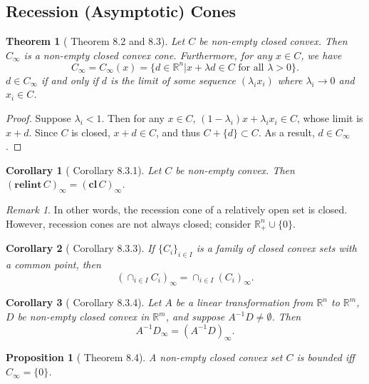 \documentclass[openany]{book}
\newtheorem{corollary}{Corollary}[chapter]
\newtheorem{proposition}{Proposition}[chapter]
\newtheorem{theorem}{Theorem}[chapter]
\theoremstyle{definition}
\theoremstyle{remark}
\newtheorem*{remark}{Remark}
\begin{document}
\subsection{Recession (Asymptotic) Cones}
\begin{theorem}[\cite{R15} Theorem 8.2 and 8.3]
    Let $C$ be non-empty closed convex. Then $C_{\infty}$ is a non-empty closed convex cone. Furthermore, for any $x\in C$, we have
    \begin{equation*}
        C_{\infty}=C_{\infty}(x)=\{d\in \mathbb{R}^n|x+\lambda d\in C\textrm{ for all }\lambda>0\}.
    \end{equation*}
    $d\in C_{\infty}$ if and only if $d$ is the limit of some sequence $(\lambda_ix_i)$ where $\lambda_i\to0$ and $x_i\in C$.
\end{theorem}
\begin{proof}
    Suppose $\lambda_i<1$. Then for any $x\in C$, $(1-\lambda_i)x+\lambda_ix_i\in C$, whose limit is $x+d$. Since $C$ is closed, $x+d\in C$, and thus $C+\{d\}\subset C$. As a result, $d\in C_{\infty}$.
\end{proof}
\begin{corollary}[\cite{R15} Corollary 8.3.1]
    Let $C$ be non-empty convex. Then $(\mathbf{relint}\,C)_{\infty}=(\mathbf{cl}\,C)_{\infty}$.
\end{corollary}
\begin{remark}
    In other words, the recession cone of a relatively open set is closed. However, recession cones are not always closed; consider $\mathbb{R}_+^n\cup\{0\}$.
\end{remark}
\begin{corollary}[\cite{R15} Corollary 8.3.3]
    If $\{C_i\}_{i\in I}$ is a family of closed convex sets with a common point, then
    \begin{equation*}
        (\cap_{i\in I}C_i)_{\infty}=\cap_{i\in I}(C_i)_{\infty}.
    \end{equation*}
\end{corollary}
\begin{corollary}[\cite{R15} Corollary 8.3.4]
    Let $A$ be a linear transformation from $\mathbb{R}^n$ to $\mathbb{R}^m$, $D$ be non-empty closed convex in $\mathbb{R}^m$, and suppose $A^{-1}D\ne\emptyset$. Then
    \begin{equation*}
        A^{-1}D_{\infty}=(A^{-1}D)_{\infty}.
    \end{equation*}
\end{corollary}

\begin{proposition}[\cite{R15} Theorem 8.4]
    A non-empty closed convex set $C$ is bounded iff $C_{\infty}=\{0\}$.
\end{proposition}
\end{document}
